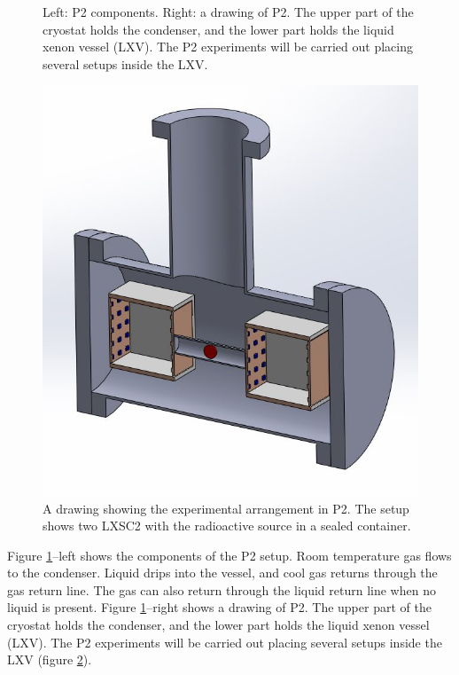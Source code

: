 \begin{figure}[!htb]
	\caption{\label{fig.cryo} Left: P2 components. Right: a drawing of P2. The upper part of the cryostat holds the condenser, and the lower part holds the liquid xenon vessel (LXV). The P2 experiments will be carried out placing several setups inside the LXV.}
\end{figure}

\begin{figure}[!htb]
	\centering
	\includegraphics[scale=0.45]{img/P2.png}
	\caption{\label{fig.P2} A drawing showing the experimental arrangement in P2. The setup shows two LXSC2 with the radioactive source in a sealed container. }
\end{figure}

Figure \ref{fig.cryo}--left shows the components of the P2 setup. Room temperature gas flows to the condenser. Liquid drips into the vessel, and cool gas returns through the gas return line. The gas can also return through the liquid return line when no liquid is present. Figure \ref{fig.cryo}--right shows a drawing of P2. The upper part of the cryostat holds the condenser, and the lower part holds the liquid xenon vessel (LXV). The P2 experiments will be carried out placing several setups inside the LXV (figure \ref{fig.P2}). 

